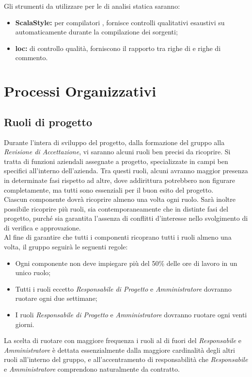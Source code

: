 \documentclass{scalatekids-article}
\begin{document}
\label{sec:AnalisiStatica}
Gli strumenti da utilizzare per le  di analisi statica saranno:
\begin{itemize}
    \item\textbf{ScalaStyle:}  per compilatori , fornisce controlli qualitativi esaustivi su  automaticamente durante la compilazione dei sorgenti;
    \item\textbf{loc:}  di controllo qualità, forniscono il rapporto tra righe di  e righe di commento.
\end{itemize}


\section{Processi Organizzativi}


\subsection{Ruoli di progetto}

Durante l'intera  di sviluppo del progetto, dalla formazione del gruppo alla
\textit{Revisione di Accettazione}, vi saranno alcuni ruoli ben precisi da ricoprire. Si
tratta di funzioni aziendali assegnate a progetto, specializzate in campi ben
specifici all'interno dell'azienda. Tra questi ruoli, alcuni avranno maggior
presenza in determinate fasi rispetto ad altre, dove addirittura
potrebbero non figurare completamente, ma tutti sono essenziali per il buon
esito del progetto.\\ Ciascun componente dovrà ricoprire almeno una volta ogni
ruolo. Sarà inoltre possibile ricoprire più ruoli, sia contemporaneamente che in
distinte fasi del progetto, purché sia garantita l'assenza di conflitti
d'interesse nello svolgimento di  di verifica e approvazione.\\
Al fine di garantire che tutti i componenti ricoprano tutti i ruoli almeno una volta, il gruppo seguirà le seguenti regole:
\begin{itemize}
    \item Ogni componente non deve impiegare più del 50\% delle ore di lavoro in un unico ruolo;
    \item Tutti i ruoli eccetto \textit{Responsabile di Progetto} e \textit{Amministratore} dovranno ruotare ogni due settimane;
    \item I ruoli \textit{Responsabile di Progetto} e \textit{Amministratore} dovranno ruotare ogni venti giorni.
\end{itemize}
La scelta di ruotare con maggiore frequenza i ruoli al di fuori del
\textit{Responsabile} e \textit{Amministratore} è dettata essenzialmente dalla
maggiore cardinalità degli altri ruoli all'interno del gruppo, e
all'accentramento di responsabilità che \textit{Responsabile} e
\textit{Amministratore} comprendono naturalmente da contratto.
\end{document}
